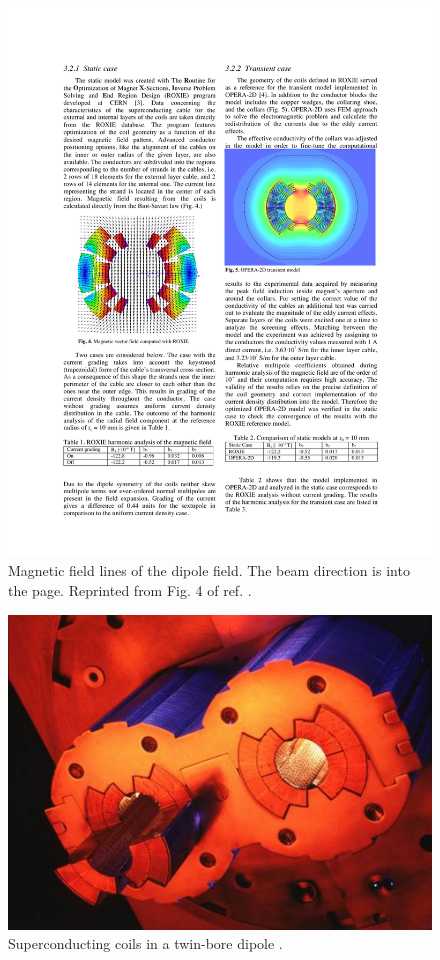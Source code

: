 \documentclass[dissertation.tex]{subfiles}
\begin{document}
\begin{figure}
	\centering
	\includegraphics[scale=1.0]{dipole_field}
	\caption{Magnetic field lines of the dipole field.  The beam direction is into the page.  Reprinted from Fig. 4 of ref. \cite{828202}.}
	\label{fig:dipole_field}
\end{figure}

\begin{figure}
	\centering
	\includegraphics[scale=1.0]{coil_windings}
	\caption{Superconducting coils in a twin-bore dipole \cite{LHC_outreach_magnets}.}
	\label{fig:coil_windings}
\end{figure}
\end{document}
